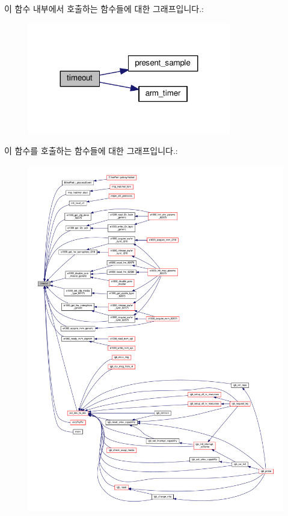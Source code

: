 이 함수 내부에서 호출하는 함수들에 대한 그래프입니다.\+:
\nopagebreak
\begin{figure}[H]
\begin{center}
\leavevmode
\includegraphics[width=251pt]{aaf-listener_8c_a869c60cb165af7b6177060c00c5c416c_cgraph}
\end{center}
\end{figure}




이 함수를 호출하는 함수들에 대한 그래프입니다.\+:
\nopagebreak
\begin{figure}[H]
\begin{center}
\leavevmode
\includegraphics[width=350pt]{aaf-listener_8c_a869c60cb165af7b6177060c00c5c416c_icgraph}
\end{center}
\end{figure}




